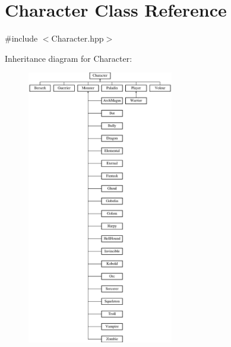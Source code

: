 \section{Character Class Reference}
\label{class_character}


{\ttfamily \#include $<$Character.\-hpp$>$}

Inheritance diagram for Character\-:\begin{figure}[H]
\begin{center}
\leavevmode
\includegraphics[height=12.000000cm]{class_character}
\end{center}
\end{figure}
